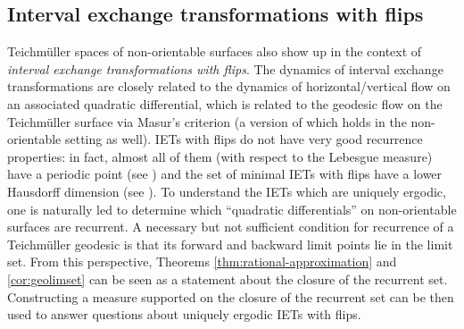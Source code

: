 \documentclass[12pt, reqno]{amsart}
\begin{document}


\subsection*{Interval exchange transformations with flips}

Teichm\"uller spaces of non-orientable surfaces also show up in the context of \emph{interval exchange transformations with flips}.
The dynamics of interval exchange transformations are closely related to the dynamics of horizontal/vertical flow on an associated quadratic differential, which is related to the geodesic flow on the Teichm\"uller surface via Masur's criterion (a version of which holds in the non-orientable setting as well).
IETs with flips do not have very good recurrence properties: in fact, almost all of them (with respect to the Lebesgue measure) have a periodic point (see \cite{nogueira_1989}) and the set of minimal IETs with flips have a lower Hausdorff dimension (see \cite{skripchenko2018hausdorff}).
To understand the IETs which are uniquely ergodic, one is naturally led to determine which ``quadratic differentials'' on non-orientable surfaces are recurrent.
A necessary but not sufficient condition for recurrence of a Teichm\"uller geodesic is that its forward and backward limit points lie in the limit set.
From this perspective, Theorems \ref{thm:rational-approximation} and \ref{cor:geolimset} can
be seen as a statement about the closure of the recurrent set.
Constructing a measure supported on the closure of the recurrent set can be then used to answer questions about uniquely ergodic IETs with flips.
\end{document}
